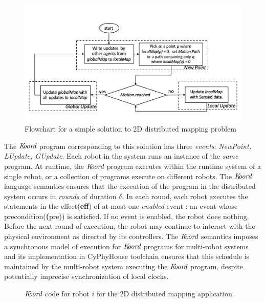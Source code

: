 \begin{figure}[!htbp]
    \centering
    \includegraphics[width=\linewidth]{figs/map_flowchart.png}
    \caption{Flowchart for a simple solution to 2D distributed mapping problem\vspace{-2mm}}
    \label{fig:flowmap1}
\end{figure}

The $\emph{K\kern-2pt oord}$ program corresponding to this solution has three \emph{events}: \emph{NewPoint, LUpdate, GUpdate}. Each robot in the system runs an instance of the \emph{same} program. At runtime, the $\emph{K\kern-2pt oord}$ program executes within the runtime system of a single robot, or a collection of programs execute on different robots. The $\emph{K\kern-2pt oord}$ language semantics ensures that the execution of the program in the distributed system occurs in \emph{rounds} of duration $\delta$. In each round, each robot executes the statements in the effect(\textbf{eff}) of at most one \emph{enabled} event : an event whose precondition(\textbf(pre)) is satisfied. If no event is enabled, the robot does nothing. Before the next round of execution, the robot may continue to interact with the physical environment as directed by its controllers. The $\emph{K\kern-2pt oord}$ semantics imposes a synchronous model of execution for $\emph{K\kern-2pt oord}$ programs for multi-robot systems and its implementation in CyPhyHouse toolchain ensures that this schedule is maintained by the multi-robot system executing the $\emph{K\kern-2pt oord}$ program, despite potentially imprecise synchronization of local clocks.

\begin{figure}[!htbp]
    \noindent
        \begin{center}
            \scriptsize
            {}
            {}
        \end{center}

    \caption{$\emph{K\kern-2pt oord}$ code for robot $i$ for the 2D distributed mapping application. \vspace{-5mm}}
    \label{fig:mapapp}
\end{figure}


